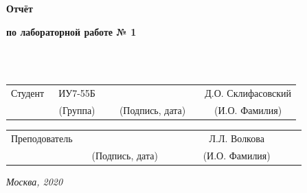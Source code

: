 \documentclass[12pt]{report}
\begin{document}
\begin{titlepage}
		
		\begin{center}
			\vspace{3cm}
			{\bf\huge Отчёт\par}
			{\bf\Large по лабораторной работе № 1\par}
			\vspace{0.5cm}
		\end{center}
		
		
		\noindent
		\\
		
		\noindent
		\\
		
		\vspace{1.5cm}
		\noindent
		\begin{tabular}{l c c c c c}
			Студент      & ~ИУ7-55Б~               & \hspace{3.5cm} & \hspace{3.5cm}                 & &  Д.О. Склифасовский \\\cline{2-2}\cline{4-4} \cline{6-6} 
			\hspace{3cm} & {\footnotesize(Группа)} &                & {\footnotesize(Подпись, дата)} & & {\footnotesize(И.О. Фамилия)}
		\end{tabular}
		
		\vspace{1cm}
		
		\noindent
		\begin{tabular}{l c c c c}
			Преподователь & \hspace{6cm}   & \hspace{3.5cm}                 & & ~~~~~~ Л.Л. Волкова ~~~~~~\\\cline{3-3} \cline{5-5} 
			\hspace{3cm}  &                & {\footnotesize(Подпись, дата)} & & {\footnotesize(И.О. Фамилия)}
		\end{tabular}
		
		\begin{center}	
			\vfill
			\large \textit {Москва, 2020}
		\end{center}
		
		\thispagestyle {empty}
		\pagebreak
	\end{titlepage}
	\restoregeometry
	
	\tableofcontents
	\onehalfspacing
	\newpage
\end{document}
